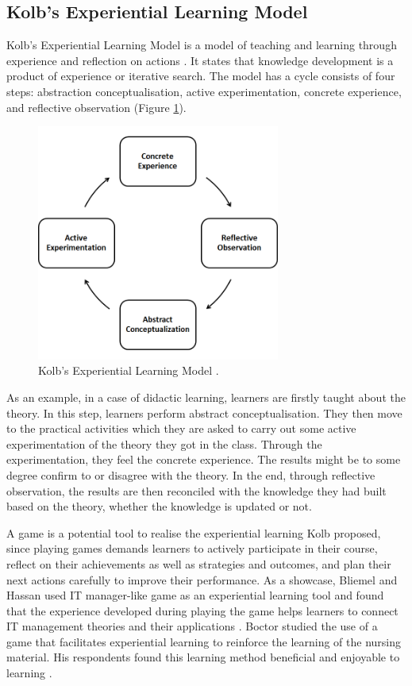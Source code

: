 \documentclass[12pt, a4paper]{report}
\begin{document}
\subsection{Kolb's Experiential Learning Model}
Kolb's Experiential Learning Model is a model of teaching and learning through experience and reflection on actions \cite{kolb2014experiential}. It states that knowledge development is a product of experience or iterative search. The model has a cycle consists of four steps: abstraction conceptualisation, active experimentation, concrete experience, and reflective observation (Figure \ref{kolb}). 

\begin{figure}[ht]
\centering
\includegraphics[width=8cm]{kolb}
\caption{Kolb's Experiential Learning Model \cite{kolb2014experiential}.}
\label{kolb}
\end{figure}

As an example, in a case of didactic learning, learners are firstly taught about the theory. In this step, learners perform abstract conceptualisation. They then move to the practical activities which they are asked to carry out some active experimentation of the theory they got in the class. Through the experimentation, they feel the concrete experience. The results might be to some degree confirm to or disagree with the theory. In the end, through reflective observation, the results are then reconciled with the knowledge they had built based on the theory, whether the knowledge is updated or not. 

A game is a potential tool to realise the experiential learning Kolb proposed, since playing games demands learners to actively participate in their course, reflect on their achievements as well as strategies and outcomes, and plan their next actions carefully to improve their performance. As a showcase, Bliemel and Hassan used IT manager-like game as an experiential learning tool and found that the experience developed during playing the game helps learners to connect IT management theories and their applications \cite{bliemel2014game}. Boctor studied the use of a game that facilitates experiential learning to reinforce the learning of the nursing material. His respondents found this learning method beneficial and enjoyable to learning \cite{boctor2013active}. 
\end{document}
